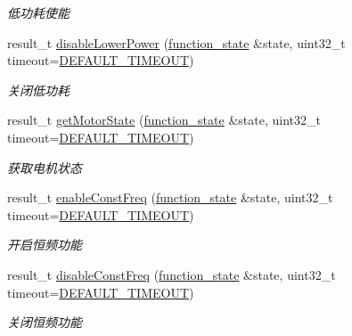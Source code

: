 \begin{DoxyCompactItemize}
\begin{DoxyCompactList}\small\item\em 低功耗使能 ~\newline
\end{DoxyCompactList}\item 
result\+\_\+t \hyperlink{classydlidar_1_1_y_dlidar_driver_a18895e94f42ce61890b4912727cdfbd8}{disable\+Lower\+Power} (\hyperlink{structfunction__state}{function\+\_\+state} \&state, uint32\+\_\+t timeout=\hyperlink{classydlidar_1_1_y_dlidar_driver_a13a4f2dc4067b43794b2c47c06d5d27aa07c79ce96f468ff4b40495ef84584442}{D\+E\+F\+A\+U\+L\+T\+\_\+\+T\+I\+M\+E\+O\+UT})
\begin{DoxyCompactList}\small\item\em 关闭低功耗 ~\newline
\end{DoxyCompactList}\item 
result\+\_\+t \hyperlink{classydlidar_1_1_y_dlidar_driver_af5d460ababe4b8a34b02d33268f24d4d}{get\+Motor\+State} (\hyperlink{structfunction__state}{function\+\_\+state} \&state, uint32\+\_\+t timeout=\hyperlink{classydlidar_1_1_y_dlidar_driver_a13a4f2dc4067b43794b2c47c06d5d27aa07c79ce96f468ff4b40495ef84584442}{D\+E\+F\+A\+U\+L\+T\+\_\+\+T\+I\+M\+E\+O\+UT})
\begin{DoxyCompactList}\small\item\em 获取电机状态 ~\newline
\end{DoxyCompactList}\item 
result\+\_\+t \hyperlink{classydlidar_1_1_y_dlidar_driver_a1e5c25618be9867dfdb1aa2f5e9cb93c}{enable\+Const\+Freq} (\hyperlink{structfunction__state}{function\+\_\+state} \&state, uint32\+\_\+t timeout=\hyperlink{classydlidar_1_1_y_dlidar_driver_a13a4f2dc4067b43794b2c47c06d5d27aa07c79ce96f468ff4b40495ef84584442}{D\+E\+F\+A\+U\+L\+T\+\_\+\+T\+I\+M\+E\+O\+UT})
\begin{DoxyCompactList}\small\item\em 开启恒频功能 ~\newline
\end{DoxyCompactList}\item 
result\+\_\+t \hyperlink{classydlidar_1_1_y_dlidar_driver_ae4b3883dd18bf01737bc4783d2dae974}{disable\+Const\+Freq} (\hyperlink{structfunction__state}{function\+\_\+state} \&state, uint32\+\_\+t timeout=\hyperlink{classydlidar_1_1_y_dlidar_driver_a13a4f2dc4067b43794b2c47c06d5d27aa07c79ce96f468ff4b40495ef84584442}{D\+E\+F\+A\+U\+L\+T\+\_\+\+T\+I\+M\+E\+O\+UT})
\begin{DoxyCompactList}\small\item\em 关闭恒频功能 ~\newline

\end{DoxyCompactList}
\end{DoxyCompactItemize}

